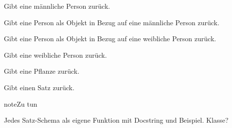 \documentclass[a4paper,12pt,oneside]{sphinxmanual}
\begin{document}

\begin{fulllineitems}
\label{funktionen:pyzufall.person_m}
Gibt eine männliche Person zurück.

\end{fulllineitems}


\begin{fulllineitems}
\label{funktionen:pyzufall.person_objekt_m}
Gibt eine Person als Objekt in Bezug auf eine männliche Person zurück.

\end{fulllineitems}


\begin{fulllineitems}
\label{funktionen:pyzufall.person_objekt_w}
Gibt eine Person als Objekt in Bezug auf eine weibliche Person zurück.

\end{fulllineitems}


\begin{fulllineitems}
\label{funktionen:pyzufall.person_w}
Gibt eine weibliche Person zurück.

\end{fulllineitems}


\begin{fulllineitems}
\label{funktionen:pyzufall.pflanze}
Gibt eine Pflanze zurück.

\end{fulllineitems}


\begin{fulllineitems}
\label{funktionen:pyzufall.satz}
Gibt einen Satz zurück.

\begin{notice}{note}{Zu tun}

Jedes Satz-Schema als eigene Funktion mit Docstring und Beispiel. Klasse?
\end{notice}

\end{fulllineitems}
\end{document}
